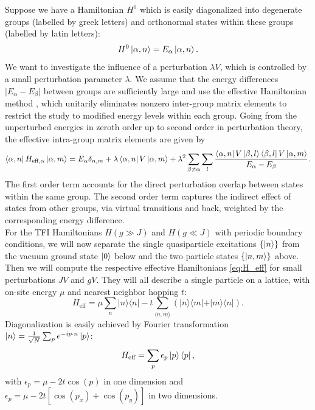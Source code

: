 \noindent Suppose we have a Hamiltonian $H^0$ which is easily diagonalized into degenerate groups (labelled by greek letters) and orthonormal states within these groups (labelled by latin letters): 
\begin{equation}
	H^0 \ket{\alpha, n} = E_{\alpha} \ket{\alpha, n}.
\end{equation}
We want to investigate the influence of a perturbation $\lambda V$, which is controlled by a small perturbation parameter $\lambda$. We assume that the energy differences $\vert E_{\alpha} - E_{\beta} \vert$ between groups are sufficiently large and use the effective Hamiltonian method \cite{sachdev2011quantum}, which unitarily eliminates nonzero inter-group matrix elements to restrict the study to modified energy levels within each group. Going from the unperturbed energies in zeroth order up to second order in perturbation theory, the effective intra-group matrix elements are given by
\begin{equation} \label{eq:H_eff}
	\bra{\alpha, n} H_{\text{eff}, \alpha} \ket{\alpha, m} = E_{\alpha} \delta_{n, m} + \lambda \bra{\alpha, n} V \ket{\alpha, m} + \lambda^2 \sum_{\beta \neq \alpha} \sum_{l} \frac{\bra{\alpha, n} V \ket{\beta, l} \bra{\beta, l} V \ket{\alpha, m}}{E_{\alpha} - E_{\beta}}.
\end{equation}
 The first order term accounts for the direct perturbation overlap between states within the same group. The second order term captures the indirect effect of states from other groups, via virtual transitions and back, weighted by the corresponding energy difference. \\
 
 \noindent For the TFI Hamiltonians $H(g \gg J)$ and $H(g \ll J)$ with periodic boundary conditions, we will now separate the single quasiparticle excitations $\{ \ket{n} \}$ from the vacuum ground state $\ket{0}$ below and the two particle states $\{ \ket{n, m} \}$ above. Then we will compute the respective effective Hamiltonians \eqref{eq:H_eff} for small perturbations $J V$ and $g V$. They will all describe a single particle on a lattice, with on-site energy $\mu$ and nearest neighbor hopping $t$:
 \begin{equation}
 	H_{\text{eff}} =  
	 \mu \sum_n \vert n \rangle \langle n \vert 
	- t \sum_{\langle n, m \rangle} \left( \vert n \rangle \langle m \vert + \vert m \rangle \langle n \vert \right).
 \end{equation}
Diagonalization is easily achieved by Fourier transformation $\ket{n} = \frac{1}{\sqrt{N}} \sum_p e^{-ip \cdot n} \ket{p}$:
\begin{equation}
	H_{\text{eff}} = \sum_p \epsilon_p \ket{p}\bra{p},
\end{equation}
with $\epsilon_p =  \mu - 2t \cos(p)$ in one dimension and $\epsilon_p =  \mu - 2t \left[ \cos(p_x) + \cos(p_y) \right]$ in two dimensions. \\

